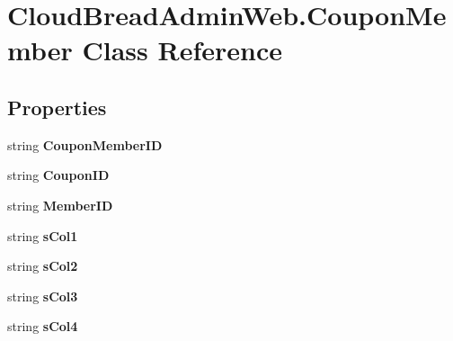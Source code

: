 \hypertarget{a00069}{}\section{Cloud\+Bread\+Admin\+Web.\+Coupon\+Member Class Reference}
\label{a00069}
\subsection*{Properties}
\begin{DoxyCompactItemize}
\item 
string {\bfseries Coupon\+Member\+ID}\hypertarget{a00069_a5be1b0593751dd79916bef28715d56a4}{}\label{a00069_a5be1b0593751dd79916bef28715d56a4}

\item 
string {\bfseries Coupon\+ID}\hypertarget{a00069_ac6e51f8ba390ea94c968eb4200a2cdef}{}\label{a00069_ac6e51f8ba390ea94c968eb4200a2cdef}

\item 
string {\bfseries Member\+ID}\hypertarget{a00069_a2e54779f4d98444c9d7a3f94e5d5a130}{}\label{a00069_a2e54779f4d98444c9d7a3f94e5d5a130}

\item 
string {\bfseries s\+Col1}\hypertarget{a00069_a0e88fed82d66d28960641f8f2479ee59}{}\label{a00069_a0e88fed82d66d28960641f8f2479ee59}

\item 
string {\bfseries s\+Col2}\hypertarget{a00069_ab1a1f19816bb2e5a4f756571548d687a}{}\label{a00069_ab1a1f19816bb2e5a4f756571548d687a}

\item 
string {\bfseries s\+Col3}\hypertarget{a00069_ae7fec901c7cdeb49efb1db0872d0e727}{}\label{a00069_ae7fec901c7cdeb49efb1db0872d0e727}

\item 
string {\bfseries s\+Col4}\hypertarget{a00069_a74e408c1f9749c8648ba9e21dec52ec9}{}\label{a00069_a74e408c1f9749c8648ba9e21dec52ec9}


\end{DoxyCompactItemize}
